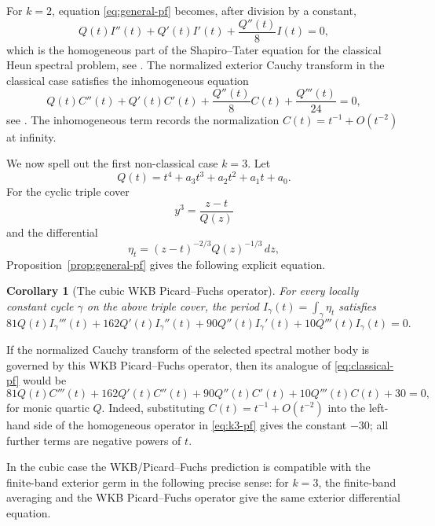 \documentclass[10pt,twoside,a4paper,reqno]{amsart}
\theoremstyle{plain}
\newtheorem{coro}           {Corollary}
\theoremstyle{definition}
\theoremstyle{remark}
\newenvironment{corollary}{\begin{coro}}{\end{coro}}
\begin{document}
For $k=2$, equation \eqref{eq:general-pf} becomes, after division by a constant,
\[
        Q(t)I''(t)+Q'(t)I'(t)+\frac{Q''(t)}8I(t)=0,
\]
which is the homogeneous part of the Shapiro--Tater equation for the classical
Heun spectral problem, see \cite{ShT}.  The normalized exterior Cauchy transform in the classical
case satisfies the inhomogeneous equation
\begin{equation}
\label{eq:classical-pf}
        Q(t)C''(t)+Q'(t)C'(t)+\frac{Q''(t)}8 C(t)+\frac{Q'''(t)}{24}=0,
\end{equation}
see \cite{ShT,STT}.  The inhomogeneous term records the normalization
$C(t)=t^{-1}+O(t^{-2})$ at infinity.

\medskip
We now spell out the first non-classical case $k=3$.  Let
\begin{equation}
\label{eq:quartic-Q}
        Q(t)=t^4+a_3t^3+a_2t^2+a_1t+a_0.
\end{equation}
For the cyclic triple cover
\[
        y^3=\frac{z-t}{Q(z)}
\]
and the differential
\[
        \eta_t=(z-t)^{-2/3}Q(z)^{-1/3}\,dz,
\]
Proposition~\ref{prop:general-pf} gives the following explicit equation.

\begin{corollary}[The cubic WKB Picard--Fuchs operator]
\label{cor:k3-pf}
For every locally constant cycle $\gamma$ on the above triple cover, the period
$I_\gamma(t)=\int_\gamma\eta_t$ satisfies
\begin{equation}
\label{eq:k3-pf}
        81Q(t)I_\gamma'''(t)+162Q'(t)I_\gamma''(t)
        +90Q''(t)I_\gamma'(t)+10Q'''(t)I_\gamma(t)=0 .
\end{equation}
\end{corollary}

If the normalized Cauchy transform of the selected spectral mother body is governed
by this WKB Picard--Fuchs operator, then its analogue of \eqref{eq:classical-pf}
would be
\begin{equation}
\label{eq:k3-inhom}
        81Q(t)C'''(t)+162Q'(t)C''(t)+90Q''(t)C'(t)+10Q'''(t)C(t)+30=0,
\end{equation}
for monic quartic $Q$.  Indeed, substituting
$C(t)=t^{-1}+O(t^{-2})$ into the left-hand side of the homogeneous operator in
\eqref{eq:k3-pf} gives the constant $-30$; all further terms are negative powers
of $t$.

\medskip
In the cubic case the WKB/Picard--Fuchs prediction is compatible with the
finite-band exterior germ in the following precise sense: for \(k=3\), the
finite-band averaging and the WKB Picard--Fuchs operator give the same exterior
differential equation.
\end{document}
